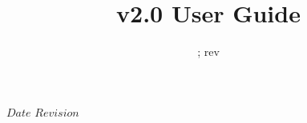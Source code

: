 



\newcommand{\Atmosphere}{\texttt{Atmosphere}}
\newcommand{\Cloud}{\texttt{Cloud}}
\newcommand{\Aerosol}{\texttt{Aerosol}}
\newcommand{\Surface}{\texttt{Surface}}
\newcommand{\Geometry}{\texttt{Geometry}}
\newcommand{\GeometryInfo}{\texttt{GeometryInfo}}
\newcommand{\ChannelInfo}{\texttt{ChannelInfo}}
\newcommand{\Options}{\texttt{Options}}
\newcommand{\SSUInput}{\texttt{SSU\_Input}}
\newcommand{\ZeemanInput}{\texttt{Zeeman\_Input}}
\newcommand{\AtmOptics}{\texttt{AtmOptics}}
\newcommand{\SfcOptics}{\texttt{SfcOptics}}
\newcommand{\RTSolution}{\texttt{RTSolution}}
\newcommand{\SensorData}{\texttt{SensorData}}
\newcommand{\AtmAbsorption}{\texttt{AtmAbsorption}}
\newcommand{\AtmScatter}{\texttt{AtmScatter}}
\newcommand{\CloudScatter}{\texttt{CloudScatter}}
\newcommand{\AerosolScatter}{\texttt{AerosolScatter}}
\newcommand{\SpcCoeff}{\texttt{SpcCoeff}}
\newcommand{\f}[1]{\texttt{#1}}
\newcommand{\tblhd}[1]{\sffamily\textbf{#1}}

\newcommand{\inarg}[1]{\f{\textcolor{green}{#1}}}
\newcommand{\outarg}[1]{\f{\textcolor{red}{#1}}}
\newcommand{\optarg}[1]{\f{\textit{#1}}}

\newcommand{\dstar}{\ensuremath{\delta^{*}\!}}
\newcommand{\radunit}{mW/(m\ensuremath{^2}.sr.\invcm)}
\newcommand{\ticket}[1]{\href{https://svnemc.ncep.noaa.gov/trac/crtm/ticket/#1}{{#1}}}

\SVN $Date$
\SVN $Revision$

\title{v2.0 User Guide}
\date{\SVNDate ; rev\SVNRevision}



\maketitle

